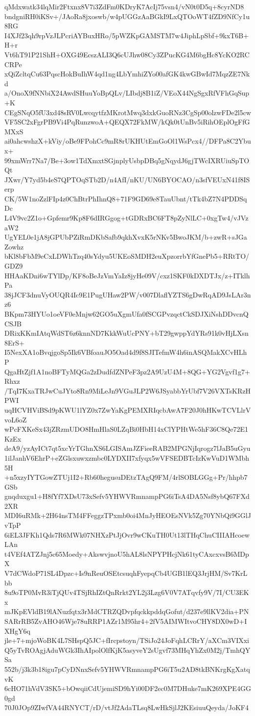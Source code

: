 qMdxwatk34lqMir2Ftxnx8V7i3ZdFm0KDryK7AcIj75vsn4/vN0t0D5q+8cyrND8
bndgniRH0iKSv+/JAoRa8jxoswb/w4pUGGzAaBGkI9LxQTOoWT4fZD9NfCy1u8RG
I4XJf23qh9rpVzJLPcriAYBuxHRo/5pWZKpGAMSTM7w4JiphLpSbf+9kxT6B+H+r
Vt6hT91P21ShH+OXG49EcszALI3Q6cUJhw08Cy3ZPucKG4M6bgHc8YcKO2RCCRPe
xQiZcltqCu63PqscHokBuIhW4qd1ng4LbYmhiZYo00afGK4kwGBwId7MqzZE7Nkd
a/OnoX9fNNbiX24AwdSHuuYoBpQLv/LIbdj8B1iZ/VEoX44NgSgxRfVFhGqSup+K
CEgSNqO5fU3xd48sRV0LwcqytfzMKrotMwq3dxkGuoRNz3CgSp00olzwFDe2l5cw
VF5SC2xFgrPB9Vi4PqRunzwoA+QEQX72FkMW/kQk0tUnBv5iRihOEplOgFfGMXxS
ai0ahcwshzX+kViy/oBe9FPohCc9mR8rUKHUtEmGoOl1WsPcx4//DFPa8C2Ybux+
99xmWrr7Na7/Be+3ow1TdXmxtSGjnplyUsbpDBq5gNqydJ6gjTWcIXRUiuSpTOQt
JXwr/Y7yd5b4eS7QPTOqSTb2D/n4AfI/nKU/UN6BYOCAO/n3sfVEUxN41f8ISerp
CK/5W1noZzlFIp4z0ChBtrPhIhnQ8+71F9GD69e8TauUbnt/tTk4bZ7N4PDDSqDc
L4V9vc2Z1o+Gpfemr9Kp8F6dIRGgog+tGDRxBC6FT8pZyNlLC+0xgTw4/vJVzaW2
UgYEL0e1jA8jGPUbPZiRmDKbSafb9qkhXvxK5rNKv5BwoJKM/b+zwR+sJGaZowhz
bKl8bFbM9eCxLDWhTzq40sYdyu5UKEoSMDH2euXpzorrbYfGnePb5+RRtTO/GDZ9
HHAaKDni6wTYlDp/KF8oBeJzVmYaIz8jyHe09V/cxz1SKF0kDXDTJx/z+ITklhPa
38jJCF3dnuVyOUQR4Ic9E1PugUHaw2PW/v007DlaflYZTS6gDwRqAD9JsLAr3nz6
BKpm73HYUo1oeVF0eMnjw62GO5uXgmUfa0fSCGPvzqctCkSDJXiNshDDvcnQCSJB
DRixKKmIAtqWdST6z6knnND7KkkWuUcPNY+bT29gwppYdYRs91k0vHjLXsn8ErS+
I5NexXA1oBvqjgoSp5Ik6VBfoauJO5Oad4d9f8SJITefmW4h6inASQMakXCvHLhP
QgaHtZjf1A1noBFTyMQGa2zDudfdZNPeF3pz2A9UzU4M+8QG+YG2Vgvf1g7+Rhxz
/TqI7KxaTRJwCuJYto8Rn9MiLeJn9VGuJLP2W6JSyabbYrUbf7V26VXTsKRzHPWI
uqHCVHViBSd9pKWU1lYZ0x7ZwYaKgPEMXRIqcbAwA7F20J0hHKwTCVLlrVvoL6oZ
wPcFXKeSx43jZRzmUDO8HmHlaS0LZqBi0HbH14xClYPHtWe5hF36C8Qe72E1KzEx
deA9/yzAyICt7qt5xcYrTGhnXS6LGISAmJZFieeRAB2MPGNjIqrogz7lJaB5uGyu
1ilJanhV6EhrP+eZGlsxuwxzmbc0LYDXII7xfyqx5wVFSEDBTcIzKwVuD1WMbh5H
+n5xzyIYTGowZTUj1I2+Rb60hegusuDEtzTAgQ9FM/4rlSOBLGGg+Pr/hhpb7GSb
gnqduxgu1+H8fYf7XDsU73xSefv5YHWVRmnampPG6iTsA4DA5Nsf8ybQ67FXd2XR
MDI6uRMk+2H64nsTM4FFeggzTPxmb0oi4MnJyHEOEsNVk5Zg70YNbQi9GGlJvTpP
6iEL3JFKh1Qds7R6MWk07NHXzPtJjOvr9wCKuTH0Ut13lTHqChuCIIIAHcoewLAn
t4VEf4ATZJnj5c65Moedy+AkswvjnoU5hAL8lsNPYPHcjNk61tyCAxcxvsB6MDpX
V7dCWdoP71SL4Dpzc+Is9nReuOSEtcsuqhFyepqCb4UGB1lEQ3JrjHM/Sv7KrLbb
8u9oTP0MvR3iTjQUv4TSjRhIZtQnRrkt2YL2j3Lzg6V0V7ATqvfy9V/7I/CU3EKx
mJKpEVldB19lANuzfqtx3rMdCTRZQDvpfqckkpddqGofut/d237e9llKV2dia+PN
SARrRB5ZvAHO46Wje78uRRP1AZr1M95hr4+2fV5AIMWItvoCHY8DX0wD+IXHgY6q
jle+7+mjoWoBK4L7SHspQ5JC+fIrcpstoyn/TSiJo24JoFqhLCRrY/aXCm3VIXxi
Q5yTvROAgjAduWGk3IhAIpolOlfKjK5asyveY2sUgvf73MHqYhZx0M2j/TmhQYSa
552b/j3k3b18igu7pCyDNnxSefv5YHWVRmnampPG6iT5u2AD8tkBNKrgKgXatqvK
6cHO71hVdV3SK5+bOwqiiCdUjemiSD9hYi00DF2ec0M7DHuke7mK269XPE4GG0gd
70J0JOp9ZIwfVA44RNYCT/rD/vtJf2AdaTLsq8LwHkSjlJ2KEsiuuQeyda/JoKF4
